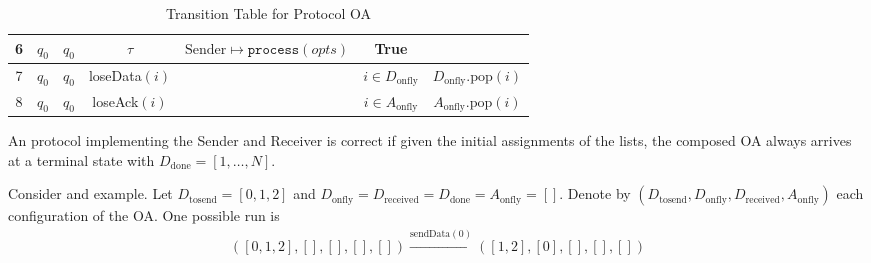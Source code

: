 \begin{table}[h]
\begin{tabular}{|c|c|c|c|c|c|c|}
		6    & $q_0$  & $q_0$  & $\tau$                  & $\text{Sender}\mapsto \texttt{process}(opts)$ & True                          &                                                                                                                                                      \\
		\hline
		7    & $q_0$  & $q_0$  & loseData$(i)$           &                                               & $i\in D_\text{onfly}$         & $D_{\text{onfly}}.\text{pop}(i)$                                                                                                                     \\
		\hline
		8    & $q_0$  & $q_0$  & loseAck$(i)$            &                                               & $i\in A_\text{onfly}$         & $A_{\text{onfly}}.\text{pop}(i)$                                                                                                                     \\
		\hline
	\end{tabular}
	\caption{Transition Table for Protocol OA}
	\label{tab:transitions}
\end{table}

An protocol implementing the Sender and Receiver is correct if given the initial assignments of the lists, the composed OA always arrives at a terminal state with $D_\text{done} = [1,\ldots,N]$.

Consider and example. Let $D_{\text{tosend}} = [0, 1, 2]$ and $D_{\text{onfly}}=D_{\text{received}}=D_{\text{done}}=A_{\text{onfly}}=[]$. Denote by $(D_{\text{tosend}}, D_{\text{onfly}}, D_{\text{received}}, A_{\text{onfly}})$ each configuration of the OA. One possible run is
\begin{align*}
	([0,1,2], [], [], [], []) \xrightarrow{\text{sendData}(0)} ([1,2], [0], [], [], [])
\end{align*}